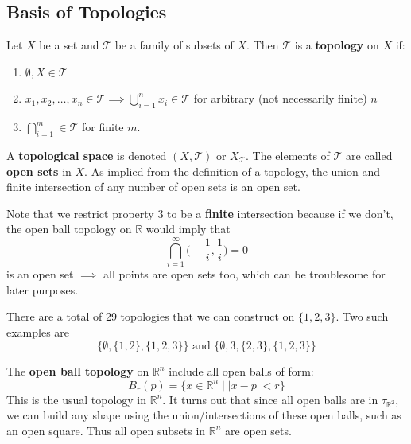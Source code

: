 \documentclass{article}
\begin{document}
  \subsection{Basis of Topologies}

    \begin{definition}[Topology]
      Let $X$ be a set and $\mathscr{T}$ be a family of subsets of $X$. Then $\mathscr{T}$ is a \textbf{topology} on $X$ if: 
      \begin{enumerate}
        \item $\emptyset, X \in \mathscr{T}$
        \item $x_1, x_2, \ldots, x_n \in \mathscr{T} \implies \bigcup_{i = 1}^{n} x_{i} \in \mathscr{T}$ for arbitrary (not necessarily finite) $n$
        \item $\bigcap_{i=1}^{m} \in \mathscr{T}$ for finite $m$. 
      \end{enumerate}
      A \textbf{topological space} is denoted $(X, \mathscr{T})$ or $X_{\mathscr{T}}$. The elements of $\mathscr{T}$ are called \textbf{open sets} in $X$. As implied from the definition of a topology, the union and finite intersection of any number of open sets is an open set. 
    \end{definition}

    Note that we restrict property 3 to be a \textbf{finite} intersection because if we don't, the open ball topology on $\mathbb{R}$ would imply that 
    \[ \bigcap_{i = 1}^{\infty} \Big( - \frac{1}{i}, \frac{1}{i} \Big) = 0\]
    is an open set $\implies$ all points are open sets too, which can be troublesome for later purposes. 

    \begin{example}
    There are a total of 29 topologies that we can construct on $\{1, 2, 3\}$. Two such examples are 
    \[\{\emptyset, \{1, 2\}, \{1, 2, 3\}\} \text{ and } \{\emptyset, 3, \{2, 3\}, \{1, 2, 3\}\}\]
    \end{example}

    \begin{example}
    The \textbf{open ball topology} on $\mathbb{R}^{n}$ include all open balls of form: 
    \[ B_{r}(p) = \{ x \in \mathbb{R}^{n} \; | \; |x-p| < r \} \]
    This is the usual topology in $\mathbb{R}^{n}$. It turns out that since all open balls are in $\tau_{\mathbb{R}^{2}}$, we can build any shape using the union/intersections of these open balls, such as an open square. Thus all open subsets in $\mathbb{R}^{n}$ are open sets. 
    \end{example}
\end{document}
